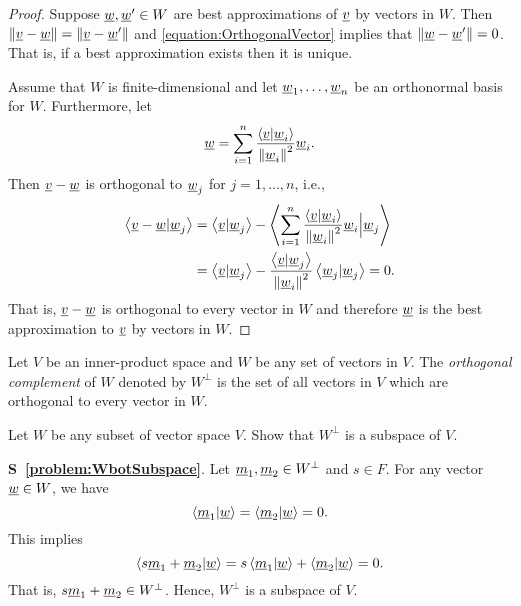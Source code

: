 \begin{proof}
Suppose $\underline{w}, \underline{w}' \in W$ are best approximations of $\underline{v}$ by vectors in $W$.
Then $\left\| \underline{v} - \underline{w} \right\| = \left\| \underline{v} - \underline{w}' \right\|$ and \eqref{equation:OrthogonalVector} implies that $\left\| \underline{w} - \underline{w}' \right\| = 0$.
That is, if a best approximation exists then it is unique.

Assume that $W$ is finite-dimensional and let $\underline{w}_1, \ldots, \underline{w}_n$ be an orthonormal basis for $W$.
Furthermore, let
\begin{equation*}
\underline{w} = \sum_{i=1}^n \frac{ \left\langle \underline{v} | \underline{w}_i \right\rangle }{ \left\| \underline{w}_i \right\|^2 } \underline{w}_i .
\end{equation*}
Then $\underline{v} -\underline{w}$ is orthogonal to $\underline{w}_j$ for $j = 1, \ldots, n$, i.e.,
\begin{equation*}
\begin{split}
\left\langle \underline{v} - \underline{w} | \underline{w}_j \right\rangle
&= \left\langle \underline{v} | \underline{w}_j \right\rangle
- \left\langle \sum_{i=1}^n \frac{ \left\langle \underline{v} | \underline{w}_i \right\rangle }{ \left\| \underline{w}_i \right\|^2 } \underline{w}_i \Big| \underline{w}_j \right\rangle \\
&= \left\langle \underline{v} | \underline{w}_j \right\rangle
- \frac{ \left\langle \underline{v} | \underline{w}_j \right\rangle }{ \left\| \underline{w}_i \right\|^2 } \left\langle \underline{w}_j | \underline{w}_j \right\rangle
= 0.
\end{split}
\end{equation*}
That is, $\underline{v} - \underline{w}$ is orthogonal to every vector in $W$ and therefore $\underline{w}$ is the best approximation to $\underline{v}$ by vectors in $W$.
\end{proof}

\begin{definition}
Let $V$ be an inner-product space and $W$ be any set of vectors in $V$.
The \emph{orthogonal complement} of $W$ denoted by $W^{\bot}$ is the set of all vectors in $V$ which are orthogonal to every vector in $W$.
\end{definition}

\begin{problem} \label{problem:WbotSubspace}
Let $W$ be any subset of vector space $V$.
Show that $W^{\bot}$ is a subspace of $V$.
\end{problem}
\noindent
\textbf{S~\ref{problem:WbotSubspace}}.
Let $\underline{m}_1, \underline{m}_2 \in W^{\bot}$ and $s \in F$.
For any vector $\underline{w} \in W$, we have
\begin{equation*}
\left\langle \underline{m}_1 | \underline{w} \right\rangle
= \left\langle \underline{m}_2 | \underline{w} \right\rangle
= 0.
\end{equation*}
This implies
\begin{equation*}
\left\langle s \underline{m}_1 + \underline{m}_2 | \underline{w} \right\rangle
= s \left\langle \underline{m}_1 | \underline{w} \right\rangle
+ \left\langle \underline{m}_2 | \underline{w} \right\rangle
= 0.
\end{equation*}
That is, $s \underline{m}_1 + \underline{m}_2 \in W^{\bot}$.
Hence, $W^{\bot}$ is a subspace of $V$.


